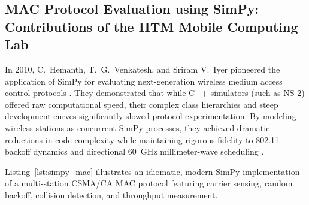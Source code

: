 \subsection{MAC Protocol Evaluation using SimPy: Contributions of the IITM Mobile Computing Lab}
In 2010, C.~Hemanth, T.~G.~Venkatesh, and Sriram V.~Iyer pioneered the application of SimPy for evaluating next-generation wireless medium access control protocols \cite{hemanth2010simpy}. They demonstrated that while C++ simulators (such as NS-2) offered raw computational speed, their complex class hierarchies and steep development curves significantly slowed protocol experimentation. By modeling wireless stations as concurrent SimPy processes, they achieved dramatic reductions in code complexity while maintaining rigorous fidelity to 802.11 backoff dynamics and directional 60~GHz millimeter-wave scheduling \cite{hemanth2010simpy}.

Listing~\ref{lst:simpy_mac} illustrates an idiomatic, modern SimPy implementation of a multi-station CSMA/CA MAC protocol featuring carrier sensing, random backoff, collision detection, and throughput measurement.

